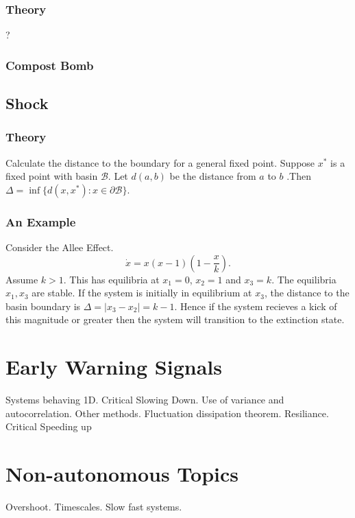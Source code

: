 \subsubsection{Theory}
?
\subsubsection{Compost Bomb}
\subsection{Shock}
\subsubsection{Theory}
Calculate the distance to the boundary for a general fixed point. Suppose $x^*$ is a fixed point with basin $\mathcal{B}$. Let $d(a,b)$ be the distance from
$a$ to $b$ .Then $\Delta = \inf \{d(x,x^*) : x \in \partial\mathcal{B}\}$.
\subsubsection{An Example}
Consider the Allee Effect.
\begin{equation}
  \label{eq:allee_effect}
  \dot{x} = x\left(x-1\right)\left(1-\frac{x}{k}\right).
\end{equation}
Assume $k > 1$. This has equilibria at $x_1 = 0$, $x_2 = 1$ and $x_3 = k$. The equilibria $x_1,x_3$ are stable. If the system is
initially in equilibrium at $x_3$, the distance to the basin boundary is $\Delta = |x_3 - x_2| = k - 1$. Hence if the system recieves a kick of
this magnitude or greater then the system will transition to the extinction state.

\section{Early Warning Signals}
Systems behaving 1D. Critical Slowing Down. Use of variance and
autocorrelation. Other methods. Fluctuation dissipation theorem.
Resiliance. Critical Speeding up


\section{Non-autonomous Topics}
Overshoot. Timescales. Slow fast systems.